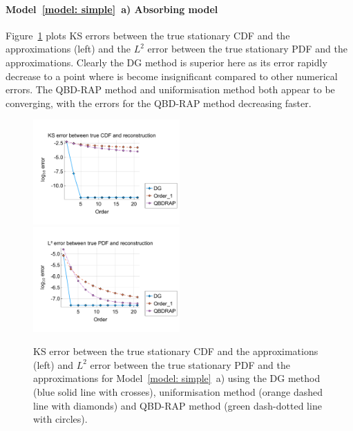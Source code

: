 \paragraph{Model~\ref{model: simple}~a) Absorbing model}
Figure~\ref{fig: absorbing stationary} plots KS errors between the true stationary CDF and the approximations (left) and the \(L^2\) error between the true stationary PDF and the approximations. Clearly the DG method is superior here as its error rapidly decrease to a point where is become insignificant compared to other numerical errors. The QBD-RAP method and uniformisation method both appear to be converging, with the errors for the QBD-RAP method decreasing faster.
\begin{figure}
	\centering
	\includegraphics[width=0.5\textwidth,trim={0.75cm 0.8cm 0.25cm 1.25cm},clip]{chapter6/figs/hitting_times_model/absorbing_model/stationary_distribution/ks_error_formatted.pdf}%
	\includegraphics[width=0.5\textwidth,trim={0.75cm 0.8cm 0.25cm 1.25cm},clip]{chapter6/figs/hitting_times_model/absorbing_model/stationary_distribution/l2_pdf_error_formatted.pdf}
	\caption{KS error between the true stationary CDF  and the approximations (left) and \(L^2\) error between the true stationary PDF and the approximations for Model~\ref{model: simple}~a) using the DG method (blue solid line with crosses), uniformisation method (orange dashed line with diamonds) and QBD-RAP method (green dash-dotted line with circles).} 
	\label{fig: absorbing stationary} 
\end{figure}

